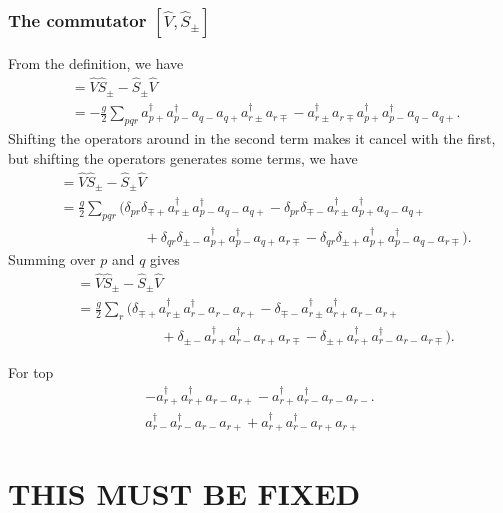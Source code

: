 \documentclass[a4paper, 11pt, notitlepage, english]{article}
\newcommand{\op}[1]{\hat{#1}}
\begin{document}
\subsubsection*{The commutator $[\op{V}, \op{S}_\pm]$}
From the definition, we have
\begin{align*}
[\op{V}, \op{S}_\pm] &= \op{V}\op{S}_\pm - \op{S}_\pm\op{V} \\
&= -\frac{g}{2}\sum_{pqr} a_{p+}^\dagger a_{p-}^\dagger a_{q-} a_{q+} a_{r\pm}^\dagger a_{r\mp} - a_{r\pm}^\dagger a_{r\mp} a_{p+}^\dagger a_{p-}^\dagger a_{q-} a_{q+}.
\end{align*}
Shifting the operators around in the second term makes it cancel with the first, but shifting the operators generates some terms, we have
\begin{align*}
[\op{V}, \op{S}_\pm] &= \op{V}\op{S}_\pm - \op{S}_\pm\op{V} \\
&= \frac{g}{2}\sum_{pqr}
\big(\delta_{pr}\delta_{\mp +}  a_{r\pm}^\dagger a_{p-}^\dagger a_{q-} a_{q+}
- \delta_{pr}\delta_{\mp -} a_{r\pm}^\dagger a_{p+}^\dagger a_{q-} a_{q+} \\
&\qquad\qquad\qquad + \delta_{qr}\delta_{\pm -} a_{p+}^\dagger   a_{p-}^\dagger a_{q+} a_{r\mp}
- \delta_{qr} \delta_{\pm +}a_{p+}^\dagger   a_{p-}^\dagger a_{q-} a_{r\mp}\big).
\end{align*}
Summing over $p$ and $q$ gives
\begin{align*}
[\op{V}, \op{S}_\pm] &= \op{V}\op{S}_\pm - \op{S}_\pm\op{V} \\
&= \frac{g}{2}\sum_{r}
\big(\delta_{\mp +} a_{r\pm}^\dagger a_{r-}^\dagger a_{r-} a_{r+}
- \delta_{\mp -} a_{r\pm}^\dagger a_{r+}^\dagger a_{r-} a_{r+} \\
&\qquad\qquad\qquad + \delta_{\pm -} a_{r+}^\dagger   a_{r-}^\dagger a_{r+} a_{r\mp}
-  \delta_{\pm +}a_{r+}^\dagger   a_{r-}^\dagger a_{r-} a_{r\mp}\big).
\end{align*}

For top
\begin{align*}
-a_{r+}^\dagger a_{r+}^\dagger a_{r-} a_{r+} - a_{r+}^\dagger   a_{r-}^\dagger a_{r-} a_{r-}. \\
a_{r-}^\dagger a_{r-}^\dagger a_{r-} a_{r+} + a_{r+}^\dagger   a_{r-}^\dagger a_{r+} a_{r+}
\end{align*}

\section{THIS MUST BE FIXED}
\end{document}
